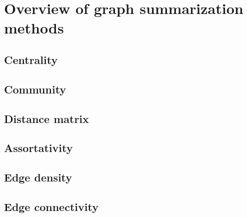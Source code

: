 \section{Overview of graph summarization methods}
\label{sec:gc:methods}

\subsection{Centrality}

\subsection{Community}

\subsection{Distance matrix}

\subsection{Assortativity}

\subsection{Edge density}

\subsection{Edge connectivity}